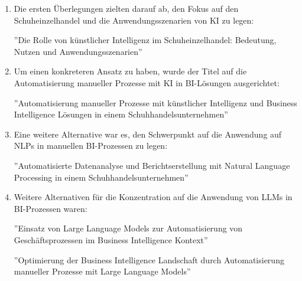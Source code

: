 \begin{enumerate}
    \item Die ersten Überlegungen zielten darauf ab, den Fokus auf den Schuheinzelhandel und die Anwendungsszenarien von KI zu legen:
    
    ''Die Rolle von künstlicher Intelligenz im Schuheinzelhandel: Bedeutung, Nutzen und Anwendungsszenarien''

    \item Um einen konkreteren Ansatz zu haben, wurde der Titel auf die Automatisierung manueller Prozesse mit KI in BI-Lösungen ausgerichtet:
    
    ''Automatisierung manueller Prozesse mit künstlicher Intelligenz und Business Intelligence Lösungen in einem Schuhhandelsunternehmen''

    \item Eine weitere Alternative war es, den Schwerpunkt auf die Anwendung auf NLPs in manuellen BI-Prozessen zu legen:
    
    ''Automatisierte Datenanalyse und Berichtserstellung mit Natural Language Processing in einem Schuhhandelsunternehmen''

    \item Weitere Alternativen für die Konzentration auf die Anwendung von LLMs in BI-Prozessen waren:
    
    ''Einsatz von Large Language Models zur Automatisierung von Geschäftsprozessen im Business Intelligence Kontext''

    ''Optimierung der Business Intelligence Landschaft durch Automatisierung manueller Prozesse mit Large Language Models''
\end{enumerate}

\clearpage